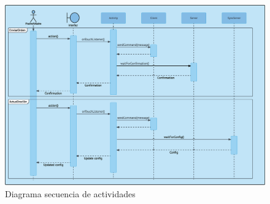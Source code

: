 \documentclass[12pt]{article}
\begin{document}
    \begin{figure}[h!]
    \centering
        \includegraphics[scale=0.32]{main_activity_sequence_diagram.eps}
        \caption{Diagrama secuencia de actividades}
        \label{fig:main_activity_sequence_diagram}
    \end{figure}
\end{document}
